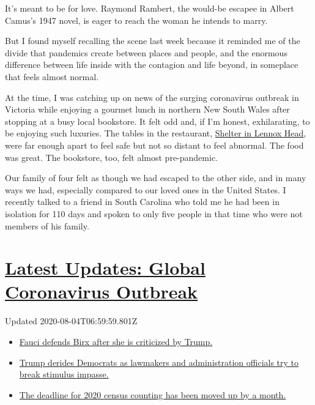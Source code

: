 It's meant to be for love. Raymond Rambert, the would-be escapee in
Albert Camus's 1947 novel, is eager to reach the woman he intends to
marry.

But I found myself recalling the scene last week because it reminded me
of the divide that pandemics create between places and people, and the
enormous difference between life inside with the contagion and life
beyond, in someplace that feels almost normal.

At the time, I was catching up on news of the surging coronavirus
outbreak in Victoria while enjoying a gourmet lunch in northern New
South Wales after stopping at a busy local bookstore. It felt odd and,
if I'm honest, exhilarating, to be enjoying such luxuries. The tables in
the restaurant,
\href{https://www.nytimes.com/2018/08/16/dining/restaurants-northern-rivers-byron-bay.html}{Shelter
in Lennox Head}, were far enough apart to feel safe but not so distant
to feel abnormal. The food was great. The bookstore, too, felt almost
pre-pandemic.

Our family of four felt as though we had escaped to the other side, and
in many ways we had, especially compared to our loved ones in the United
States. I recently talked to a friend in South Carolina who told me he
had been in isolation for 110 days and spoken to only five people in
that time who were not members of his family.

\hypertarget{latest-updates-global-coronavirus-outbreak}{%
\section{\texorpdfstring{\href{https://www.nytimes.com/2020/08/03/world/coronavirus-covid-19.html?action=click\&pgtype=Article\&state=default\&region=MAIN_CONTENT_1\&context=storylines_live_updates}{Latest
Updates: Global Coronavirus
Outbreak}}{Latest Updates: Global Coronavirus Outbreak}}\label{latest-updates-global-coronavirus-outbreak}}

Updated 2020-08-04T06:59:59.801Z

\begin{itemize}
\tightlist
\item
  \href{https://www.nytimes.com/2020/08/03/world/coronavirus-covid-19.html?action=click\&pgtype=Article\&state=default\&region=MAIN_CONTENT_1\&context=storylines_live_updates\#link-4547638f}{Fauci
  defends Birx after she is criticized by Trump.}
\item
  \href{https://www.nytimes.com/2020/08/03/world/coronavirus-covid-19.html?action=click\&pgtype=Article\&state=default\&region=MAIN_CONTENT_1\&context=storylines_live_updates\#link-15e7f995}{Trump
  derides Democrats as lawmakers and administration officials try to
  break stimulus impasse.}
\item
  \href{https://www.nytimes.com/2020/08/03/world/coronavirus-covid-19.html?action=click\&pgtype=Article\&state=default\&region=MAIN_CONTENT_1\&context=storylines_live_updates\#link-e5a2cda}{The
  deadline for 2020 census counting has been moved up by a month.}
\end{itemize}

